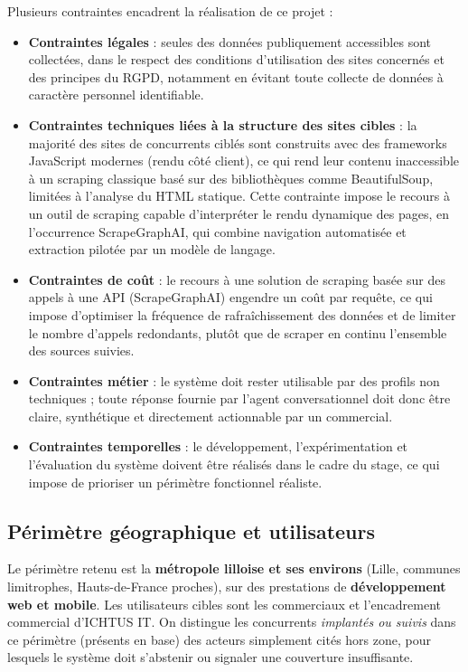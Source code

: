 Plusieurs contraintes encadrent la réalisation de ce projet :
\begin{itemize}
    \item \textbf{Contraintes légales} : seules des données publiquement accessibles sont collectées, dans le
    respect des conditions d'utilisation des sites concernés et des principes du RGPD, notamment en évitant
    toute collecte de données à caractère personnel identifiable.
    \item \textbf{Contraintes techniques liées à la structure des sites cibles} : la majorité des sites de
    concurrents ciblés sont construits avec des frameworks JavaScript modernes (rendu côté client), ce qui
    rend leur contenu inaccessible à un scraping classique basé sur des bibliothèques comme BeautifulSoup,
    limitées à l'analyse du HTML statique. Cette contrainte impose le recours à un outil de scraping capable
    d'interpréter le rendu dynamique des pages, en l'occurrence ScrapeGraphAI, qui combine navigation
    automatisée et extraction pilotée par un modèle de langage.
    \item \textbf{Contraintes de coût} : le recours à une solution de scraping basée sur des appels à une API
    (ScrapeGraphAI) engendre un coût par requête, ce qui impose d'optimiser la fréquence de rafraîchissement
    des données et de limiter le nombre d'appels redondants, plutôt que de scraper en continu l'ensemble des
    sources suivies.
    \item \textbf{Contraintes métier} : le système doit rester utilisable par des profils non techniques ; toute
    réponse fournie par l'agent conversationnel doit donc être claire, synthétique et directement actionnable
    par un commercial.
    \item \textbf{Contraintes temporelles} : le développement, l'expérimentation et l'évaluation du système
    doivent être réalisés dans le cadre du stage, ce qui impose de prioriser un périmètre fonctionnel réaliste.
\end{itemize}

\subsection{Périmètre géographique et utilisateurs}

Le périmètre retenu est la \textbf{métropole lilloise et ses environs} (Lille, communes limitrophes,
Hauts-de-France proches), sur des prestations de \textbf{développement web et mobile}. Les utilisateurs
cibles sont les commerciaux et l'encadrement commercial d'ICHTUS IT. On distingue les concurrents
\textit{implantés ou suivis} dans ce périmètre (présents en base) des acteurs simplement cités hors zone,
pour lesquels le système doit s'abstenir ou signaler une couverture insuffisante.

